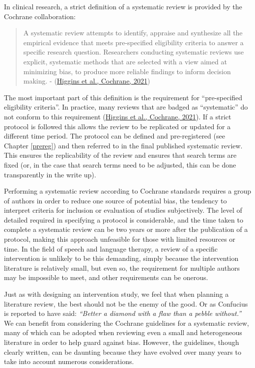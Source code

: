 \documentclass{krantz}
\begin{document}
In clinical research, a strict definition of a systematic review is provided by the Cochrane collaboration:

\begin{quote}
A systematic review attempts to identify, appraise and synthesize all the empirical evidence that meets pre-specified eligibility criteria to answer a specific research question. Researchers conducting systematic reviews use explicit, systematic methods that are selected with a view aimed at minimizing bias, to produce more reliable findings to inform decision making. - (\protect\hyperlink{ref-higgins2021}{Higgins et al., Cochrane, 2021})
\end{quote}

The most important part of this definition is the requirement for ``pre-specified eligibility criteria''. In practice, many reviews that are badged as ``systematic'' do not conform to this requirement (\protect\hyperlink{ref-higgins2021}{Higgins et al., Cochrane, 2021}). If a strict protocol is followed this allows the review to be replicated or updated for a different time period. The protocol can be defined and pre-registered (see Chapter \ref{prereg}) and then referred to in the final published systematic review. This ensures the replicability of the review and ensures that search terms are fixed (or, in the case that search terms need to be adjusted, this can be done transparently in the write up).

Performing a systematic review according to Cochrane standards requires a group of authors in order to reduce one source of potential bias, the tendency to interpret criteria for inclusion or evaluation of studies subjectively. The level of detailed required in specifying a protocol is considerable, and the time taken to complete a systematic review can be two years or more after the publication of a protocol, making this approach unfeasible for those with limited resources or time. In the field of speech and language therapy, a review of a specific intervention is unlikely to be this demanding, simply because the intervention literature is relatively small, but even so, the requirement for multiple authors may be impossible to meet, and other requirements can be onerous.

Just as with designing an intervention study, we feel that when planning a literature review, the best should not be the enemy of the good. Or as Confucius is reported to have said: \emph{``Better a diamond with a flaw than a pebble without.''} We can benefit from considering the Cochrane guidelines for a systematic review, many of which can be adopted when reviewing even a small and heterogeneous literature in order to help guard against bias. However, the guidelines, though clearly written, can be daunting because they have evolved over many years to take into account numerous considerations.
\end{document}
